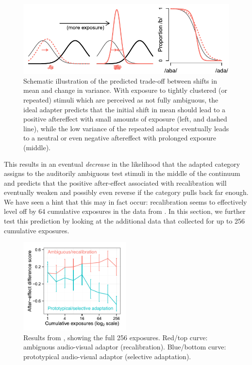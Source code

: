 \begin{figure}[htb]
  \centering
  \includegraphics[width=\textwidth]{schematic-recal.pdf}
  \caption{Schematic illustration of the predicted trade-off between shifts in mean and change in variance.  With exposure to tightly clustered (or repeated) stimuli which are perceived as not fully ambiguous, the ideal adapter predicts that the initial shift in mean should lead to a positive aftereffect with small amounts of exposure (left, and dashed line), while the low variance of the repeated adaptor eventually leads to a neutral or even negative aftereffect with prolonged exposure (middle).}
  \label{fig:mcgurk-preds-schematic}
\end{figure}

This results in an eventual \emph{decrease} in the likelihood that the adapted category assigns to the auditorily ambiguous test stimuli in the middle of the continuum and predicts that the positive after-effect associated with recalibration will eventually weaken and possibly even reverse if the category pulls back far enough.  We have seen a hint that this may in fact occur: recalibration seems to effectively level off by 64 cumulative exposures in the data from \textcite{Vroomen2007}.  In this section, we further test this prediction by looking at the additional data that \textcite{Vroomen2007} collected for up to 256 cumulative exposures.


\begin{figure}[htb]
  \centering
  \includegraphics[width=0.5\textwidth]{vroomen-ae-first.pdf}
  \caption{Results from \protect\textcite{Vroomen2007}, showing the full 256 exposures.  Red/top curve: ambiguous audio-visual adaptor (recalibration).  Blue/bottom curve: prototypical audio-visual adaptor (selective adaptation).}
  \label{fig:vroomen-results-256}
\end{figure}

